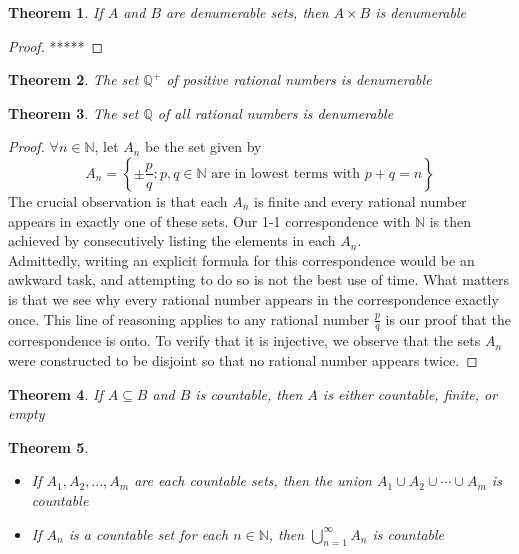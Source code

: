 \documentclass[10pt]{report}
\newtheorem{thm2}{Theorem}[section]
\begin{document}
\begin{thm2}
If $A$ and $B$ are denumerable sets, then $A \times B$ is denumerable
\end{thm2}
\begin{proof}
*****
\end{proof}
\begin{thm2}
The set $\mathbb{Q}^+$ of positive rational numbers is denumerable
\end{thm2}
\begin{thm2}
The set $\mathbb{Q}$ of all rational numbers is denumerable
\end{thm2}
\begin{proof}
$\forall n\in\mathbb{N}$, let $A_n$ be the set given by
$$A_n = \left\lbrace\pm\frac{p}{q}:p,q\in\mathbb{N}\text{  are in lowest terms with  } p + q = n\right\rbrace$$
The crucial observation is that each $A_n$ is finite and every rational number appears in exactly one of these sets. Our 1-1 correspondence with $\mathbb{N}$ is then achieved by consecutively listing the elements in each $A_n$.\\
Admittedly, writing an explicit formula for this correspondence would be an awkward task, and attempting to do so is not the best use of time. What matters is that we see why every rational number appears in the correspondence exactly once. This line of reasoning applies to any rational number $\frac{p}{q}$ is our proof that the correspondence is onto. To verify that it is injective, we observe that the sets $A_n$ were constructed to be disjoint so that no rational number appears twice.
\end{proof}
\begin{thm2}
If $A\subseteq B$ and $B$ is countable, then $A$ is either countable, finite, or empty
\end{thm2}
\begin{thm2}
\begin{itemize}
\item[(i)] If $A_1, A_2,...,A_m$ are each countable sets, then the union $A_1 \cup A_2 \cup \cdots \cup A_m$ is countable
\item[(ii)] If $A_n$ is a countable set for each $n\in\mathbb{N}$, then $\bigcup_{n=1}^\infty A_n$ is countable
\end{itemize}
\end{thm2}
\end{document}
